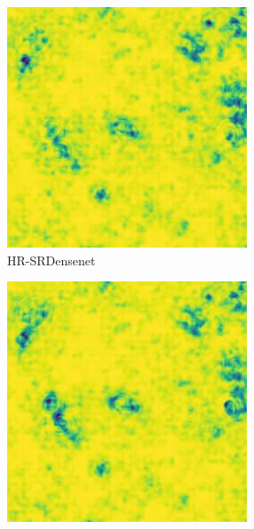 \begin{figure}[H]
  \begin{subfigure}[b]{0.275\textwidth}
    \includegraphics[width=\textwidth]{Chapter7/SSIM_densenet_9.jpg}
    \caption{HR-SRDensenet}
  \end{subfigure}
  \begin{subfigure}[b]{0.275\textwidth}
    \includegraphics[width=\textwidth]{Chapter7/SSIM_rcan_9.jpg}

\end{subfigure}
\end{figure}

